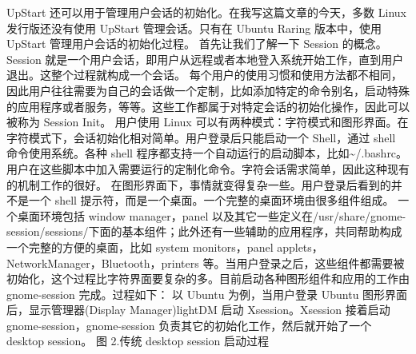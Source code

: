 \documentclass[a4paper,10pt,english]{sphinxmanual}
\begin{document}
UpStart 还可以用于管理用户会话的初始化。在我写这篇文章的今天，多数 Linux 发行版还没有使用 UpStart 管理会话。只有在 Ubuntu Raring 版本中，使用 UpStart 管理用户会话的初始化过程。
首先让我们了解一下 Session 的概念。Session 就是一个用户会话，即用户从远程或者本地登入系统开始工作，直到用户退出。这整个过程就构成一个会话。
每个用户的使用习惯和使用方法都不相同，因此用户往往需要为自己的会话做一个定制，比如添加特定的命令别名，启动特殊的应用程序或者服务，等等。这些工作都属于对特定会话的初始化操作，因此可以被称为 Session Init。
用户使用 Linux 可以有两种模式：字符模式和图形界面。在字符模式下，会话初始化相对简单。用户登录后只能启动一个 Shell，通过 shell 命令使用系统。各种 shell 程序都支持一个自动运行的启动脚本，比如\textasciitilde{}/.bashrc。用户在这些脚本中加入需要运行的定制化命令。字符会话需求简单，因此这种现有的机制工作的很好。
在图形界面下，事情就变得复杂一些。用户登录后看到的并不是一个 shell 提示符，而是一个桌面。一个完整的桌面环境由很多组件组成。
一个桌面环境包括 window manager，panel 以及其它一些定义在/usr/share/gnome-session/sessions/下面的基本组件；此外还有一些辅助的应用程序，共同帮助构成一个完整的方便的桌面，比如 system monitors，panel applets，NetworkManager，Bluetooth，printers 等。当用户登录之后，这些组件都需要被初始化，这个过程比字符界面要复杂的多。目前启动各种图形组件和应用的工作由 gnome-session 完成。过程如下：
以 Ubuntu 为例，当用户登录 Ubuntu 图形界面后，显示管理器(Display Manager)lightDM 启动 Xsession。Xsession 接着启动 gnome-session，gnome-session 负责其它的初始化工作，然后就开始了一个 desktop session。
图 2.传统 desktop session 启动过程
\end{document}
